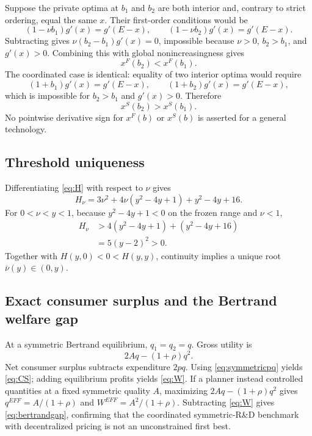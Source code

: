 Suppose the private optima at $b_1$ and $b_2$ are both interior and, contrary to strict ordering, equal the same $x$. Their first-order conditions would be
\begin{equation}
 (1-\nu b_1)g'(x)=g'(E-x),
 \qquad
 (1-\nu b_2)g'(x)=g'(E-x).
\end{equation}
Subtracting gives $\nu(b_2-b_1)g'(x)=0$, impossible because $\nu>0$, $b_2>b_1$, and $g'(x)>0$. Combining this with global nonincreasingness gives
\begin{equation}
 x^F(b_2)<x^F(b_1).
\end{equation}
The coordinated case is identical: equality of two interior optima would require
\begin{equation}
 (1+b_1)g'(x)=g'(E-x),
 \qquad
 (1+b_2)g'(x)=g'(E-x),
\end{equation}
which is impossible for $b_2>b_1$ and $g'(x)>0$. Therefore
\begin{equation}
 x^S(b_2)>x^S(b_1).
\end{equation}
No pointwise derivative sign for $x^F(b)$ or $x^S(b)$ is asserted for a general technology.

\subsection{Threshold uniqueness}
Differentiating \eqref{eq:H} with respect to $\nu$ gives
\begin{equation}
 H_\nu=3\nu^2+4\nu(y^2-4y+1)+y^2-4y+16.
\end{equation}
For $0<\nu<y<1$, because $y^2-4y+1<0$ on the frozen range and $\nu<1$,
\begin{align}
 H_\nu
 &>4(y^2-4y+1)+(y^2-4y+16)\\
 &=5(y-2)^2>0.
\end{align}
Together with $H(y,0)<0<H(y,y)$, continuity implies a unique root $\bar\nu(y)\in(0,y)$.

\subsection{Exact consumer surplus and the Bertrand welfare gap}
At a symmetric Bertrand equilibrium, $q_1=q_2=q$. Gross utility is
\begin{equation}
 2Aq-(1+\rho)q^2.
\end{equation}
Net consumer surplus subtracts expenditure $2pq$. Using \eqref{eq:symmetricpq} yields \eqref{eq:CS}; adding equilibrium profits yields \eqref{eq:W}. If a planner instead controlled quantities at a fixed symmetric quality $A$, maximizing $2Aq-(1+\rho)q^2$ gives $q^{EFF}=A/(1+\rho)$ and $W^{EFF}=A^2/(1+\rho)$. Subtracting \eqref{eq:W} gives \eqref{eq:bertrandgap}, confirming that the coordinated symmetric-R\&D benchmark with decentralized pricing is not an unconstrained first best.

